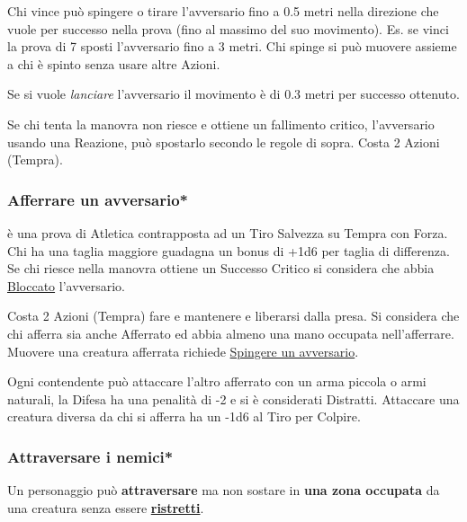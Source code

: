 \begin{multicols}{2}
Chi vince può spingere o tirare l'avversario fino a 0.5 metri nella direzione che vuole per successo nella prova (fino al massimo del suo movimento). Es. se vinci la prova di 7 sposti l'avversario fino a 3 metri. Chi spinge si può muovere assieme a chi è spinto senza usare altre Azioni.

Se si vuole \emph{lanciare} l'avversario il movimento è di 0.3 metri per successo ottenuto.

Se chi tenta la manovra non riesce e ottiene un fallimento critico, l'avversario usando una Reazione, può spostarlo secondo le regole di sopra. Costa 2 Azioni (Tempra).

\subsubsection{Afferrare un avversario*}\label{afferrareunavversario}\hypertarget{afferrareunavversario}{}

è una prova di Atletica contrapposta ad un Tiro Salvezza su Tempra con Forza. Chi ha una taglia maggiore guadagna un bonus di +1d6 per taglia di differenza. Se chi riesce nella manovra ottiene un Successo Critico si considera che abbia \hyperlink{bloccato}{Bloccato} l'avversario.

Costa 2 Azioni (Tempra) fare e mantenere e liberarsi dalla presa. Si considera che chi afferra sia anche Afferrato ed abbia almeno una mano occupata nell'afferrare.
Muovere una creatura afferrata richiede \hyperlink{spingereavversario}{Spingere un avversario}.

Ogni contendente può attaccare l'altro afferrato con un arma piccola o armi naturali, la Difesa ha una penalità di -2 e si è considerati Distratti. Attaccare una creatura diversa da chi si afferra ha un -1d6 al Tiro per Colpire.

\subsubsection{Attraversare i nemici*}\label{attraversonemici}\hypertarget{attraversarenemici}{}\hypertarget{destreggiarsi}{}

Un personaggio può \textbf{attraversare} ma non sostare in \textbf{una zona occupata} da una creatura senza essere \hyperlink{ristretto}{\textbf{ristretti}}.


\end{multicols}
